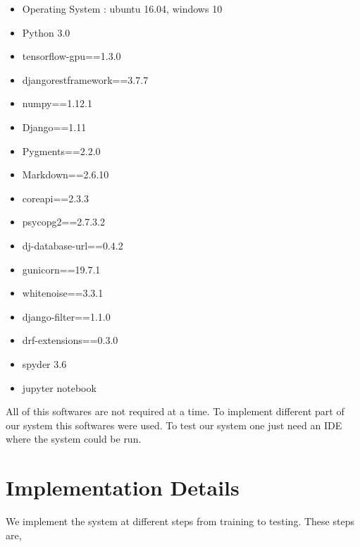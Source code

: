 \begin{itemize}
    \item Operating System : ubuntu 16.04, windows 10
    \item Python 3.0
    \item tensorflow-gpu==1.3.0
    \item djangorestframework==3.7.7
    \item numpy==1.12.1
    \item Django==1.11
    \item Pygments==2.2.0
    \item Markdown==2.6.10
    \item coreapi==2.3.3
    \item psycopg2==2.7.3.2
    \item dj-database-url==0.4.2
    \item gunicorn==19.7.1
    \item whitenoise==3.3.1
    \item django-filter==1.1.0
    \item drf-extensions==0.3.0
    \item spyder 3.6
    \item jupyter notebook
\end{itemize}
\par
\vspace{0.5cm}
\noindent
All of this softwares are not required at a time. To implement different part of our system this softwares were used. To test our system one just need an IDE where the system could be run.

\clearpage
\section{Implementation Details}
We implement the system at different steps from training to testing. These steps are,
